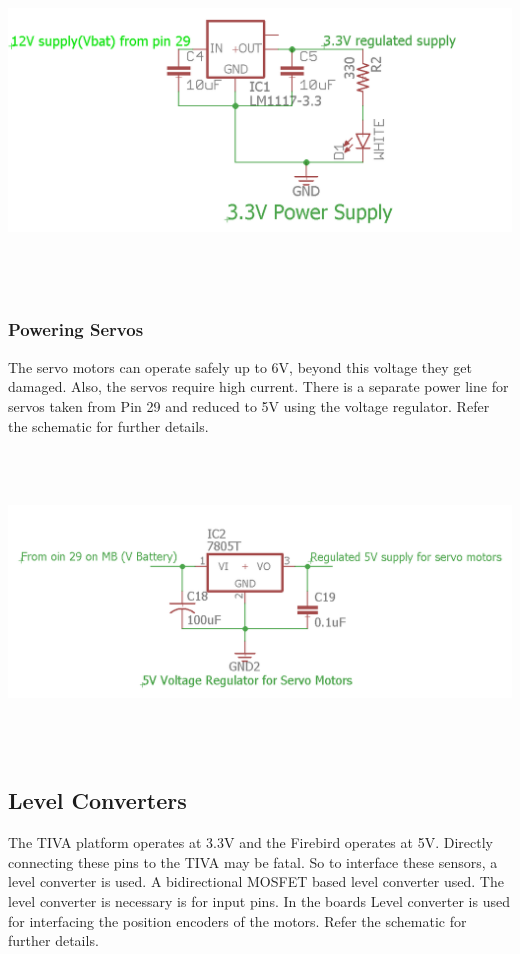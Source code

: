 \documentclass[a4paper,10pt,oneside]{article}
\begin{document}
{	\includegraphics[width=18cm, height=8cm]{3VPowerSupply}\\\\
				
	\subsubsection{\Large \textbf{Powering Servos}}
	{The servo motors can operate safely up to 6V, beyond this voltage they get damaged. Also, the servos require high current. There is a separate power line for servos taken from Pin 29 and reduced to 5V using the voltage regulator. Refer the schematic for further details.\\ }
		
	\includegraphics[width=18cm, height=8cm]{ServoPowerSupply}\\			
	\subsection{\huge \textbf{Level Converters}}
	{The TIVA platform operates at 3.3V and the Firebird operates at 5V. Directly connecting these pins to the TIVA may be fatal. So to interface these sensors, a level converter is used. A bidirectional MOSFET based level converter used. The level converter is necessary is for input pins. In the boards Level converter is used for interfacing the position encoders of the motors. Refer the schematic for further details.\\ }
		
}
\end{document}

